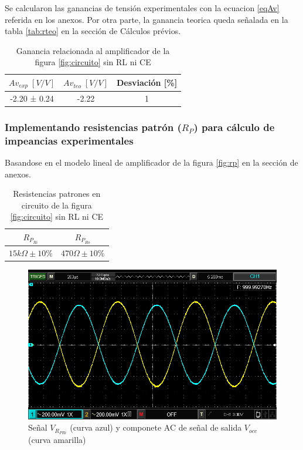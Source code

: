 \documentclass[12pt, a4paper]{article}
\begin{document}
    Se calcularon las ganancias de tensión experimentales con la ecuacion \eqref{eqAv} referida en los anexos. Por otra parte, la ganancia teorica queda señalada en la tabla \ref{tab:rteo} en la sección de Cálculos prévios.

    \begin{table}[h!]
        \centering
        \caption{Ganancia relacionada al amplificador de la figura \ref{fig:circuito} sin RL ni CE}
        \label{tab:av1}
        \begin{tabular}{|c|c|c|} \hline
            $Av_{exp} \; [V/V]$  &  $Av_{teo} \; [V/V]$  & Desviación [\%] \\ \hline
            -2.20 ± 0.24         &       -2.22              & 1   \\ \hline
        \end{tabular}
    \end{table}

    \subsubsection{Implementando resistencias patrón ($R_P$) para cálculo de impeancias experimentales}

    Basandose en el modelo lineal de amplificador de la figura \ref{fig:rp} en la sección de anexos.

    \begin{table}[h!]
        \centering
        \caption{Resistencias patrones en circuito de la figura \ref{fig:circuito} sin RL ni CE}
        \label{tab:rp1}
        \begin{tabular}{|c|c|} \hline
            $R_{P_{Ri}}$          &  $R_{P_{Ro}}$  \\ \hline
            $15k\Omega \pm 10\%$  &  $470\Omega \pm 10\%$    \\ \hline
        \end{tabular}
    \end{table}

    \begin{figure}[h!]
        \centering
        \includegraphics[height=5cm\textwidth]{RPsRLsCE.png}
        \caption{Señal $V_{R_{PRi}}$ (curva azul) y componete AC de señal de salida $V_{occ}$ (curva amarilla)}
        \label{fig:vrp1}
    \end{figure}
\end{document}
